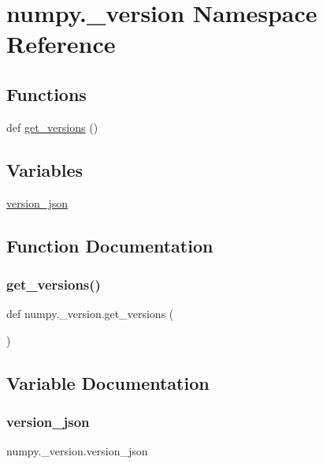 \hypertarget{namespacenumpy_1_1__version}{}\section{numpy.\+\_\+version Namespace Reference}
\label{namespacenumpy_1_1__version}
\subsection*{Functions}
\begin{DoxyCompactItemize}
\item 
def \hyperlink{namespacenumpy_1_1__version_af83c228d7a0e8865916bae3e07e876e3}{get\+\_\+versions} ()
\end{DoxyCompactItemize}
\subsection*{Variables}
\begin{DoxyCompactItemize}
\item 
\hyperlink{namespacenumpy_1_1__version_a6fb9a3da48e483c1bcd039ddedf901fe}{version\+\_\+json}
\end{DoxyCompactItemize}


\subsection{Function Documentation}
\mbox{\label{namespacenumpy_1_1__version_af83c228d7a0e8865916bae3e07e876e3}} 
\subsubsection{\texorpdfstring{get\+\_\+versions()}{get\_versions()}}
{\footnotesize\ttfamily def numpy.\+\_\+version.\+get\+\_\+versions (\begin{DoxyParamCaption}{ }\end{DoxyParamCaption})}



\subsection{Variable Documentation}
\mbox{\label{namespacenumpy_1_1__version_a6fb9a3da48e483c1bcd039ddedf901fe}} 
\subsubsection{\texorpdfstring{version\+\_\+json}{version\_json}}
{\footnotesize\ttfamily numpy.\+\_\+version.\+version\+\_\+json}

